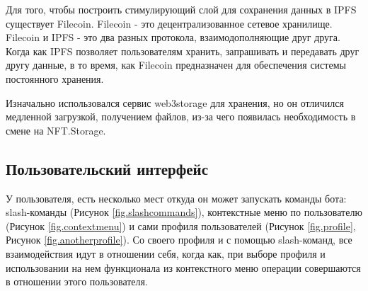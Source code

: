 \begin{remark}
    Для того, чтобы построить стимулирующий слой для сохранения данных в IPFS существует Filecoin. Filecoin - это децентрализованное сетевое хранилище. Filecoin и IPFS - это два разных протокола, взаимодополняющие друг друга. Когда как IPFS позволяет пользователям хранить, запрашивать и передавать друг другу данные, в то время, как Filecoin предназначен для обеспечения системы постоянного хранения.
\end{remark}

\begin{remark}
    Изначально использовался сервис web3storage \cite{web3storage} для хранения, но он отличился медленной загрузкой, получением файлов, из-за чего появилась необходимость в смене на NFT.Storage.
\end{remark}

\subsection{Пользовательский интерфейс}

У пользователя, есть несколько мест откуда он может запускать команды бота: slash-команды (Рисунок {\color{blue} \ref{fig.slashcommands}}), контекстные меню по пользователю (Рисунок {\color{blue} \ref{fig.contextmenu}}) и сами профиля пользователей (Рисунок {\color{blue} \ref{fig.profile}}, Рисунок {\color{blue} \ref{fig.anotherprofile}}). Со своего профиля и с помощью slash-команд, все взаимодействия идут в отношении себя, когда как, при выборе профиля и использовании на нем функционала из контекстного меню операции совершаются в отношении этого пользователя.


